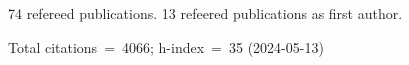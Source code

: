 74 refereed publications. 13 refeered publications as first author.

Total citations~=~4066; h-index~=~35 (2024-05-13)